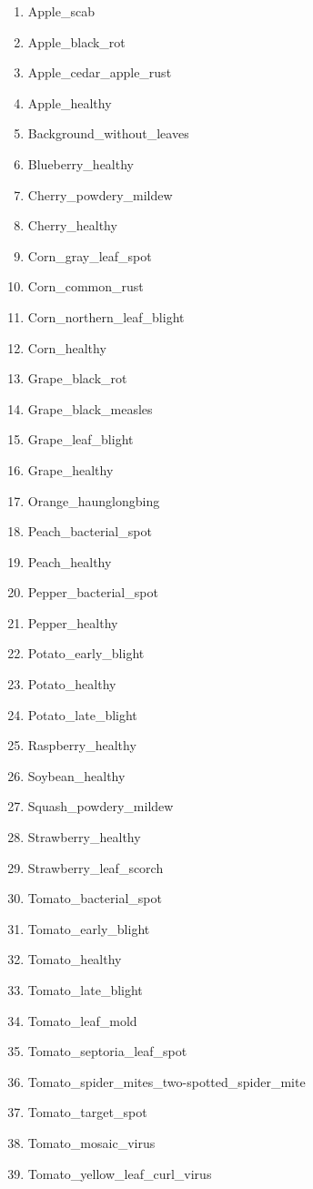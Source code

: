     
    \begin{multicols}{2}
    \begin{enumerate}
    \item Apple\_scab
    \item Apple\_black\_rot
    \item Apple\_cedar\_apple\_rust
    \item Apple\_healthy
    \item Background\_without\_leaves
    \item Blueberry\_healthy
    \item Cherry\_powdery\_mildew
    \item Cherry\_healthy
    \item Corn\_gray\_leaf\_spot
    \item Corn\_common\_rust
    \item Corn\_northern\_leaf\_blight
    \item Corn\_healthy
    \item Grape\_black\_rot
    \item Grape\_black\_measles
    \item Grape\_leaf\_blight
    \item Grape\_healthy
    \item Orange\_haunglongbing
    \item Peach\_bacterial\_spot
    \item Peach\_healthy
    \item Pepper\_bacterial\_spot
    \item Pepper\_healthy
    \item Potato\_early\_blight
    \item Potato\_healthy
    \item Potato\_late\_blight
    \item Raspberry\_healthy
    \item Soybean\_healthy
    \item Squash\_powdery\_mildew
    \item Strawberry\_healthy
    \item Strawberry\_leaf\_scorch
    \item Tomato\_bacterial\_spot
    \item Tomato\_early\_blight
    \item Tomato\_healthy
    \item Tomato\_late\_blight
    \item Tomato\_leaf\_mold
    \item Tomato\_septoria\_leaf\_spot
    \item Tomato\_spider\_mites\_two-spotted\_spider\_mite
    \item Tomato\_target\_spot
    \item Tomato\_mosaic\_virus
    \item Tomato\_yellow\_leaf\_curl\_virus
    \end{enumerate}
    \end{multicols}

